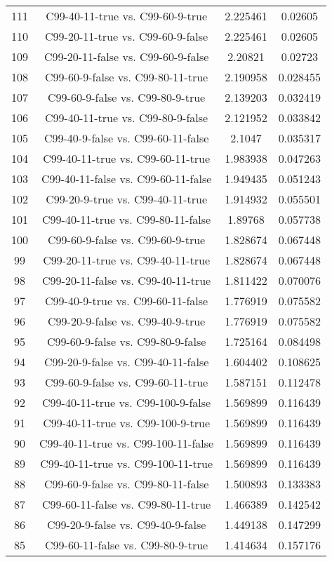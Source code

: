 \documentclass[a4paper,10pt]{article}
\begin{document}
\begin{landscape}
\begin{table}[!htp]
\begin{tabular}{cccc}
111&C99-40-11-true vs. C99-60-9-true&2.225461&0.02605\\
110&C99-20-11-true vs. C99-60-9-false&2.225461&0.02605\\
109&C99-20-11-false vs. C99-60-9-false&2.20821&0.02723\\
108&C99-60-9-false vs. C99-80-11-true&2.190958&0.028455\\
107&C99-60-9-false vs. C99-80-9-true&2.139203&0.032419\\
106&C99-40-11-true vs. C99-80-9-false&2.121952&0.033842\\
105&C99-40-9-false vs. C99-60-11-false&2.1047&0.035317\\
104&C99-40-11-true vs. C99-60-11-true&1.983938&0.047263\\
103&C99-40-11-false vs. C99-60-11-false&1.949435&0.051243\\
102&C99-20-9-true vs. C99-40-11-true&1.914932&0.055501\\
101&C99-40-11-true vs. C99-80-11-false&1.89768&0.057738\\
100&C99-60-9-false vs. C99-60-9-true&1.828674&0.067448\\
99&C99-20-11-true vs. C99-40-11-true&1.828674&0.067448\\
98&C99-20-11-false vs. C99-40-11-true&1.811422&0.070076\\
97&C99-40-9-true vs. C99-60-11-false&1.776919&0.075582\\
96&C99-20-9-false vs. C99-40-9-true&1.776919&0.075582\\
95&C99-60-9-false vs. C99-80-9-false&1.725164&0.084498\\
94&C99-20-9-false vs. C99-40-11-false&1.604402&0.108625\\
93&C99-60-9-false vs. C99-60-11-true&1.587151&0.112478\\
92&C99-40-11-true vs. C99-100-9-false&1.569899&0.116439\\
91&C99-40-11-true vs. C99-100-9-true&1.569899&0.116439\\
90&C99-40-11-true vs. C99-100-11-false&1.569899&0.116439\\
89&C99-40-11-true vs. C99-100-11-true&1.569899&0.116439\\
88&C99-60-9-false vs. C99-80-11-false&1.500893&0.133383\\
87&C99-60-11-false vs. C99-80-11-true&1.466389&0.142542\\
86&C99-20-9-false vs. C99-40-9-false&1.449138&0.147299\\
85&C99-60-11-false vs. C99-80-9-true&1.414634&0.157176\\

\end{tabular}
\end{table}
\end{landscape}
\end{document}
